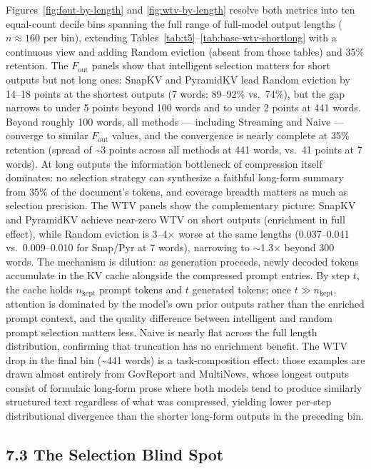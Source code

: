 \documentclass[10pt,letterpaper]{article}
\begin{document}
Figures~\ref{fig:fout-by-length} and \ref{fig:wtv-by-length} resolve both
metrics into ten equal-count decile bins spanning the full range of full-model
output lengths ($n \approx 160$ per bin), extending
Tables~\ref{tab:t5}--\ref{tab:base-wtv-shortlong} with a continuous view and adding Random eviction
(absent from those tables) and 35\% retention.  The $F_{\text{out}}$ panels show
that intelligent selection matters for short outputs but not long ones:
SnapKV and PyramidKV lead Random eviction by 14--18 points at the shortest
outputs (7 words: 89--92\% vs.\ 74\%), but the gap narrows to under 5 points
beyond 100 words and to under 2 points at 441 words.  Beyond roughly 100 words,
all methods --- including Streaming and Naive --- converge to similar
\(F_{\text{out}}\) values, and the convergence is nearly complete at 35\%
retention (spread of \textasciitilde3 points across all methods at 441 words,
vs.\ 41 points at 7 words).  At long outputs the information bottleneck of
compression itself dominates: no selection strategy can synthesize a faithful
long-form summary from 35\% of the document's tokens, and coverage breadth
matters as much as selection precision.  The WTV panels show the complementary
picture: SnapKV and PyramidKV achieve near-zero WTV on short outputs (enrichment
in full effect), while Random eviction is 3--4$\times$ worse at the same lengths
(0.037--0.041 vs.\ 0.009--0.010 for Snap/Pyr at 7 words), narrowing to
$\sim$1.3$\times$ beyond 300 words.  The mechanism is dilution: as generation
proceeds, newly decoded tokens accumulate in the KV cache alongside the
compressed prompt entries.  By step $t$, the cache holds $n_{\text{kept}}$
prompt tokens and $t$ generated tokens; once $t \gg n_{\text{kept}}$, attention
is dominated by the model's own prior outputs rather than the enriched prompt
context, and the quality difference between intelligent and random prompt
selection matters less.  Naive is nearly flat across the full length
distribution, confirming that truncation has no enrichment benefit.  The WTV
drop in the final bin (\textasciitilde441 words) is a task-composition effect:
those examples are drawn almost entirely from GovReport and MultiNews, whose
longest outputs consist of formulaic long-form prose where both models tend to
produce similarly structured text regardless of what was compressed, yielding
lower per-step distributional divergence than the shorter long-form outputs in
the preceding bin.


\hypertarget{selection-blind-spot}{%
\subsection{7.3 The Selection Blind Spot}\label{selection-blind-spot}}
\end{document}
